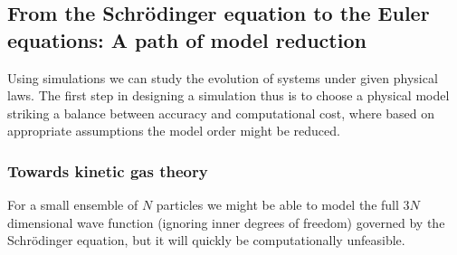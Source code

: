 
\subsection{From the Schrödinger equation to the Euler equations: A path of model reduction}

Using simulations we can study the evolution of systems 
under given physical laws. The first step in designing a simulation
thus is to choose a physical model striking a balance between
accuracy and computational cost, where based on appropriate assumptions
the model order might be reduced.

\subsubsection{Towards kinetic gas theory}
For a small ensemble of $N$ particles
we might be able to model the full $3N$ dimensional wave function
(ignoring inner degrees of freedom) governed by the Schrödinger equation, 
but it will quickly be computationally unfeasible.

